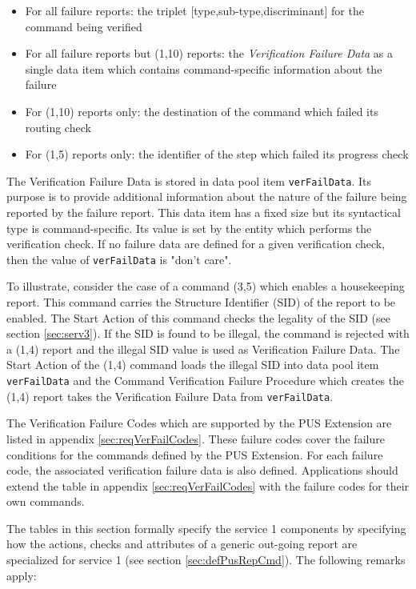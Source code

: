 \documentclass{pnp_article}
\begin{document}
\begin{itemize}
\item For all failure reports: the triplet [type,sub-type,discriminant] for the command being verified
\item For all failure reports but (1,10) reports: the \textit{Verification Failure Data} as a single data item which contains command-specific information about the failure 
\item For (1,10) reports only: the destination of the command which failed its routing check
\item For (1,5) reports only: the identifier of the step which failed its progress check
\end{itemize}

The Verification Failure Data is stored in data pool item \texttt{verFailData}. Its purpose is to provide additional information about the nature of the failure being reported by the failure report. This data item has a fixed size but its syntactical type is command-specific. Its value is set by the entity which performs the verification check. If no failure data are defined for a given verification check, then the value of \texttt{verFailData} is "don't care". 

To illustrate, consider the case of a command (3,5) which enables a housekeeping report. This command carries the Structure Identifier (SID) of the report to be enabled. The Start Action of this command checks the legality of the SID (see section \ref{sec:serv3}). If the SID is found to be illegal, the command is rejected with a (1,4) report and the illegal SID value is used as Verification Failure Data. The Start Action of the (1,4) command loads the illegal SID into data pool item \texttt{verFailData} and the Command Verification Failure Procedure which creates the (1,4) report takes the Verification Failure Data from \texttt{verFailData}.

The Verification Failure Codes which are supported by the PUS Extension are listed in appendix \ref{sec:reqVerFailCodes}. These failure codes cover the failure conditions for the commands defined by the PUS Extension. For each failure code, the associated verification failure data is also defined. Applications should extend the table in appendix \ref{sec:reqVerFailCodes} with the failure codes for their own commands. 

The tables in this section formally specify the service 1 components by specifying how the actions, checks and attributes of a generic out-going report are specialized for service 1 (see section \ref{sec:defPusRepCmd}). The following remarks apply: 
\end{document}

